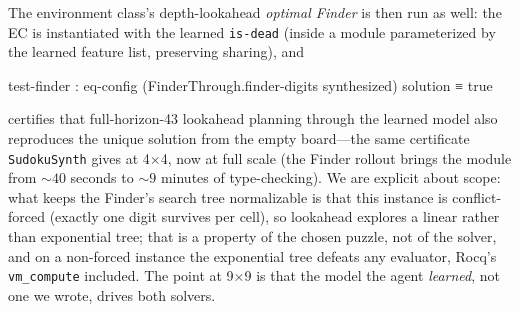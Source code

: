\documentclass[9pt,a4paper]{article}
\newcommand{\fpath}[1]{\nolinkurl{#1}}
\theoremstyle{plain}
\theoremstyle{definition}
\theoremstyle{remark}
\begin{document}
The environment class's depth-lookahead \emph{optimal Finder} is then run as well: the EC is instantiated with the learned \texttt{is-dead} (inside a module parameterized by the learned feature list, preserving sharing), and
\begin{spec}
test-finder : eq-config (FinderThrough.finder-digits synthesized) solution ≡ true
\end{spec}
certifies that full-horizon-43 lookahead planning through the learned model also reproduces the unique solution from the empty board---the same certificate \fpath{SudokuSynth} gives at 4$\times$4, now at full scale (the Finder rollout brings the module from ${\sim}40$ seconds to ${\sim}9$ minutes of type-checking).  We are explicit about scope: what keeps the Finder's search tree normalizable is that this instance is conflict-forced (exactly one digit survives per cell), so lookahead explores a linear rather than exponential tree; that is a property of the chosen puzzle, not of the solver, and on a non-forced instance the exponential tree defeats any evaluator, Rocq's \texttt{vm\_compute} included.  The point at 9$\times$9 is that the model the agent \emph{learned}, not one we wrote, drives both solvers.
\end{document}
